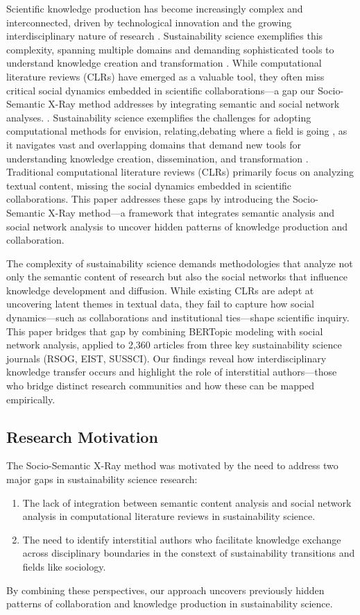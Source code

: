 \documentclass[12pt]{article}
\begin{document}
Scientific knowledge production has become increasingly complex and interconnected, driven by technological innovation and the growing interdisciplinary nature of research \cite{antons_computational_2023}. Sustainability science exemplifies this complexity, spanning multiple domains and demanding sophisticated tools to understand knowledge creation and transformation \cite{loorbach_sustainability_2017}. While computational literature reviews (CLRs) have emerged as a valuable tool, they often miss critical social dynamics embedded in scientific collaborations—a gap our Socio-Semantic X-Ray method addresses by integrating semantic and social network analyses.
. Sustainability science exemplifies the challenges for adopting computational methods for envision, relating,debating where a field is going \cite{antons_computational_2023,antons_mapping_2016}, as it navigates vast and overlapping domains that demand new tools for understanding knowledge creation, dissemination, and transformation \cite{loorbach_sustainability_2017}. Traditional computational literature reviews (CLRs) primarily focus on analyzing textual content, missing the social dynamics embedded in scientific collaborations. This paper addresses these gaps by introducing the Socio-Semantic X-Ray method—a framework that integrates semantic analysis and social network analysis to uncover hidden patterns of knowledge production and collaboration.

The complexity of sustainability science demands methodologies that analyze not only the semantic content of research but also the social networks that influence knowledge development and diffusion. While existing CLRs are adept at uncovering latent themes in textual data, they fail to capture how social dynamics—such as collaborations and institutional ties—shape scientific inquiry. This paper bridges that gap by combining BERTopic modeling with social network analysis, applied to 2,360 articles from three key sustainability science journals (RSOG, EIST, SUSSCI). Our findings reveal how interdisciplinary knowledge transfer occurs and highlight the role of interstitial authors—those who bridge distinct research communities and how these can be mapped empirically.

\subsection{Research Motivation}
The Socio-Semantic X-Ray method was motivated by the need to address two major gaps in sustainability science research: 
\begin{enumerate}
    \item The lack of integration between semantic content analysis and social network analysis in computational literature reviews in sustainability science.
    \item The need to identify interstitial authors who facilitate knowledge exchange across disciplinary boundaries in the constext of sustainability transitions and fields like sociology.
\end{enumerate}
By combining these perspectives, our approach uncovers previously hidden patterns of collaboration and knowledge production in sustainability science.
\end{document}
